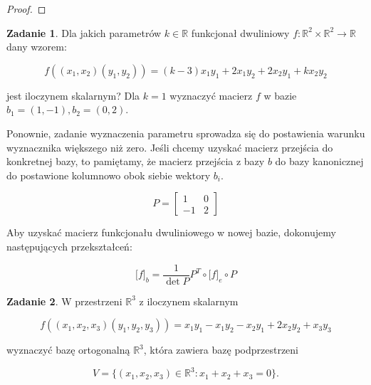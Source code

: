 \documentclass[11pt]{article}
\theoremstyle{definition}
\newtheorem{zadanie}{Zadanie}
\begin{document}
\begin{proof}
\end{proof}

\begin{zadanie}
Dla jakich parametrów $k\in\mathbb R$ funkcjonał dwuliniowy $f:\mathbb R^2\times\mathbb R^2\to\mathbb R$ dany wzorem:

$$f((x_1,x_2)(y_1,y_2))=(k-3)x_1y_1+2x_1y_2+2x_2y_1+kx_2y_2$$

jest iloczynem skalarnym? Dla $k=1$ wyznaczyć macierz $f$ w bazie $b_1=(1,-1), b_2=(0,2)$.
\end{zadanie}

Ponownie, zadanie wyznaczenia parametru sprowadza się do postawienia warunku wyznacznika większego niż zero. Jeśli chcemy uzyskać macierz przejścia do konkretnej bazy, to pamiętamy, że macierz przejścia z bazy $b$ do bazy kanonicznej do postawione kolumnowo obok siebie wektory $b_i$.

$$P = \begin{bmatrix}1&0\\-1&2\end{bmatrix}$$





Aby uzyskać macierz funkcjonału dwuliniowego w nowej bazie, dokonujemy następujących przekształceń:

$$\big[f\big]_b =\frac1{\det P} P^T\circ\big[f\big]_e\circ P$$

\begin{zadanie}
    W przestrzeni $\mathbb R^3$ z iloczynem skalarnym

    $$f((x_1,x_2,x_3)(y_1,y_2,y_3)) = x_1y_1-x_1y_2-x_2y_1+2x_2y_2+x_3y_3$$

    wyznaczyć bazę ortogonalną $\mathbb R^3$, która zawiera bazę podprzestrzeni

    $$V=\{(x_1,x_2,x_3)\in\mathbb R^3:x_1+x_2+x_3=0\}.$$
\end{zadanie}
\end{document}
